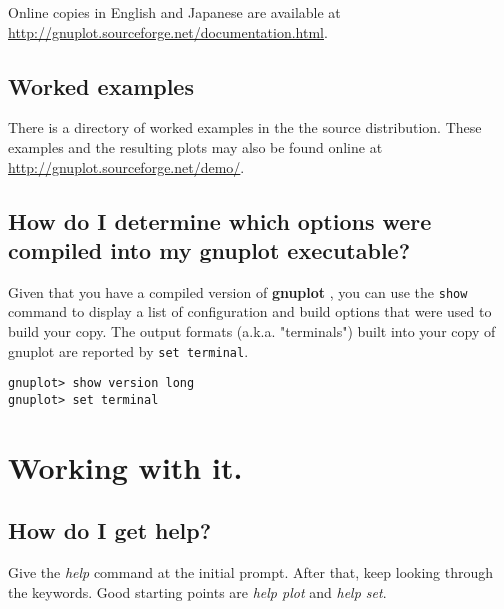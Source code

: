 \documentclass[a4paper,11pt]{article}
\def\http#1{{\small\href{http://#1}{\url{http://#1}}}}
\newcommand{\http}[1]%
            {\htmladdnormallink{\latex{\url{http://#1}}%
                    \html{\textit{http://#1}}}%
                {http://#1}%
            }
\newcommand{\gnuplot}{\textbf{gnuplot }}
\begin{document}
Online copies in English and Japanese are available at
\http{gnuplot.sourceforge.net/documentation.html}.

\subsection{Worked examples}

There is a directory of worked examples in the the source distribution.
These examples and the resulting plots may also be found online at
\http{gnuplot.sourceforge.net/demo/}.


\subsection{How do I determine which options were compiled into my \gnuplot executable?}

Given that you have a compiled version of \gnuplot, you can use the
\verb+show+ command to display a list of configuration and build options
that were used to build your copy.  The output formats (a.k.a. "terminals")
built into your copy of gnuplot are reported by \verb+set terminal+.

\small
\begin{verbatim}
gnuplot> show version long
gnuplot> set terminal
\end{verbatim}
\normalsize


\section{Working with it.}

\subsection{How do I get help?}

Give the {\em help} command at the initial prompt. After that, keep
looking through the keywords. Good starting points are {\em help plot}
and {\em help set}.
\end{document}
